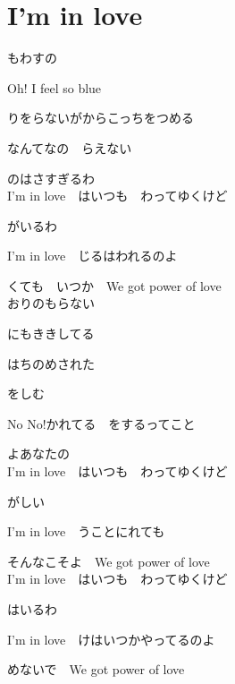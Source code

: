 \section{ I'm in love}
\large{

もわすの

Oh! I feel so blue

りをらないがからこっちをつめる

なんてなの　らえない

のはさすぎるわ
\\

I'm in love　はいつも　わってゆくけど

がいるわ

I'm in love　じるはわれるのよ

くても　いつか　We got power of love
\\

おりのもらない

にもききしてる

はちのめされた

をしむ

No No!かれてる　をするってこと

よあなたの
\\

I'm in love　はいつも　わってゆくけど

がしい

I'm in love　うことにれても

そんなこそよ　We got power of love
\\

I'm in love　はいつも　わってゆくけど

はいるわ

I'm in love　けはいつかやってるのよ

めないで　We got power of love

}